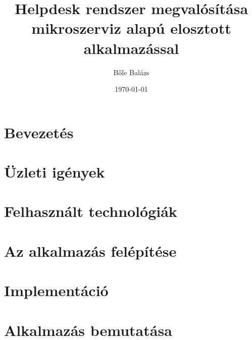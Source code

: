 


\title{\foreignlanguage{british}{Helpdesk} rendszer megvalósítása mikroszerviz alapú elosztott alkalmazással}
\author{Bőle Balázs}
\date{\today}
\graphicspath{{Figs/}}  %


\sloppy
{}
\makeatletter  %

\makeatother

\clearpage


\pagestyle{front}
\tableofcontents

\begingroup
\let\clearpage\relax
\listoffigures
\endgroup


\clearpage
{}
\chapter*{Bevezetés}\label{ch:bevezetes}



\chapter{Üzleti igények}\label{ch:uzleti_igenyek}
\pagestyle{main}



\chapter[Technológiai áttekintés]{Felhasznált technológiák}\label{ch:felhasznalt_technologiak}
\pagestyle{main}



\chapter{Az alkalmazás felépítése}\label{ch:felepites}
\pagestyle{main}



\chapter{Implementáció}\label{ch:implementacio}
\pagestyle{main}



\chapter{Alkalmazás bemutatása}\label{ch:bemutatas}
\pagestyle{main}



